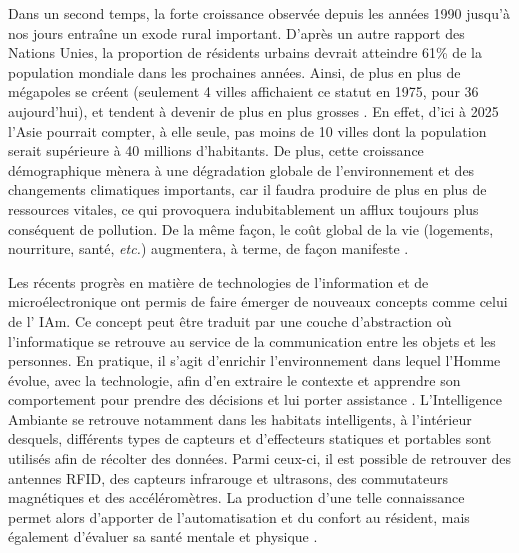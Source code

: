 Dans un second temps, la forte croissance observée depuis les années 1990 jusqu’à nos jours entraîne un exode rural important. D’après un autre rapport des Nations Unies, la proportion de résidents urbains devrait atteindre 61\% de la population mondiale dans les prochaines années. Ainsi, de plus en plus de mégapoles se créent (seulement 4 villes affichaient ce statut en 1975, pour 36 aujourd’hui), et tendent à devenir de plus en plus grosses \citep{UnitedNations2017a}. En effet, d’ici à 2025 l’Asie pourrait compter, à elle seule, pas moins de 10 villes dont la population serait supérieure à 40 millions d’habitants. De plus, cette croissance démographique mènera à une dégradation globale de l’environnement et des changements climatiques importants, car il faudra produire de plus en plus de ressources vitales, ce qui provoquera indubitablement un afflux toujours plus conséquent de pollution. De la même façon, le coût global de la vie (logements, nourriture, santé, \textit{etc.}) augmentera, à terme, de façon manifeste \citep{UnitedNations2017a}.

Les récents progrès en matière de technologies de l’information et de microélectronique ont permis de faire émerger de nouveaux concepts comme celui de l’ \ac{IAm}. Ce concept peut être traduit par une couche d’abstraction où l’informatique se retrouve au service de la communication entre les objets et les personnes. En pratique, il s’agit d’enrichir l’environnement dans lequel l’Homme évolue, avec la technologie, afin d’en extraire le contexte et apprendre son comportement pour prendre des décisions et lui porter assistance \citep{Sadri2011}. L’Intelligence Ambiante se retrouve notamment dans les habitats intelligents, à l’intérieur desquels, différents types de capteurs et d’effecteurs statiques et portables sont utilisés afin de récolter des données. Parmi ceux-ci, il est possible de retrouver des antennes RFID, des capteurs infrarouge et ultrasons, des commutateurs magnétiques et des accéléromètres. La production d’une telle connaissance permet alors d’apporter de l’automatisation et du confort au résident, mais également d’évaluer sa santé mentale et physique \citep{Rashidi2013, Haux2016, Harris2016, Johnson2018}. 

